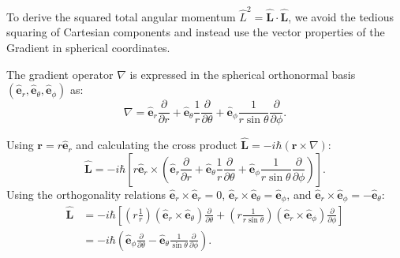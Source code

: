 To derive the squared total angular momentum $\hat{L}^2 = \hat{\mathbf{L}} \cdot
\hat{\mathbf{L}}$, we avoid the tedious squaring of Cartesian components and
instead use the vector properties of the Gradient in spherical coordinates.

The gradient operator $\nabla$ is expressed in the spherical orthonormal basis
$(\hat{\mathbf{e}}_r, \hat{\mathbf{e}}_\theta, \hat{\mathbf{e}}_\phi)$ as:
\begin{equation}
  \nabla = \hat{\mathbf{e}}_r \frac{\partial}{\partial r} +
  \hat{\mathbf{e}}_\theta \frac{1}{r} \frac{\partial}{\partial \theta} +
  \hat{\mathbf{e}}_\phi \frac{1}{r \sin\theta} \frac{\partial}{\partial \phi}.
\end{equation}

Using $\mathbf{r} = r \hat{\mathbf{e}}_r$ and calculating the cross product
$\hat{\mathbf{L}} = -i\hbar (\mathbf{r} \times \nabla)$:
\begin{equation}
  \hat{\mathbf{L}} = -i\hbar \left[ r\hat{\mathbf{e}}_r \times \left(
  \hat{\mathbf{e}}_r \frac{\partial}{\partial r} + \hat{\mathbf{e}}_\theta
  \frac{1}{r} \frac{\partial}{\partial \theta} + \hat{\mathbf{e}}_\phi
  \frac{1}{r \sin\theta} \frac{\partial}{\partial \phi} \right) \right].
\end{equation}
Using the orthogonality relations $\hat{\mathbf{e}}_r \times \hat{\mathbf{e}}_r
= 0$, $\hat{\mathbf{e}}_r \times \hat{\mathbf{e}}_\theta =
\hat{\mathbf{e}}_\phi$, and $\hat{\mathbf{e}}_r \times \hat{\mathbf{e}}_\phi =
-\hat{\mathbf{e}}_\theta$:
\begin{align}
  \hat{\mathbf{L}} &= -i\hbar \left[ \left( r \frac{1}{r} \right)
  (\hat{\mathbf{e}}_r \times \hat{\mathbf{e}}_\theta) \frac{\partial}{\partial
  \theta} + \left( r \frac{1}{r \sin\theta} \right) (\hat{\mathbf{e}}_r \times
  \hat{\mathbf{e}}_\phi) \frac{\partial}{\partial \phi} \right] \nonumber \\
                   &= -i\hbar \left( \hat{\mathbf{e}}_\phi \frac{\partial}
  {\partial \theta} - \hat{\mathbf{e}}_\theta \frac{1}{\sin\theta}
  \frac{\partial}{\partial \phi} \right). \label{eq:L_vector_spherical}
\end{align}

